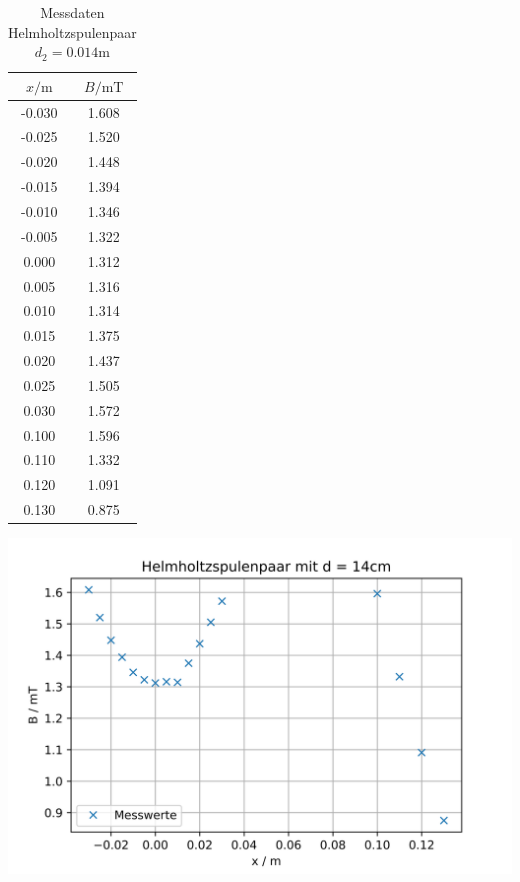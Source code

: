 \begin{table}
\centering
\caption{Messdaten Helmholtzspulenpaar $d_{2} = 0.014\unit\m$}
\begin{tabular}{c c}
  \toprule
  $x / \unit\m$ &  $B / \unit{\milli\tesla}$ \\
  \midrule
  -0.030 &        1.608 \\
  -0.025 &        1.520 \\
  -0.020 &        1.448 \\
  -0.015 &        1.394 \\
  -0.010 &        1.346 \\
  -0.005 &        1.322 \\
   0.000 &        1.312 \\
   0.005 &        1.316 \\
   0.010 &        1.314 \\
   0.015 &        1.375 \\
   0.020 &        1.437 \\
   0.025 &        1.505 \\
   0.030 &        1.572 \\
   0.100 &        1.596 \\
   0.110 &        1.332 \\
   0.120 &        1.091 \\
   0.130 &        0.875 \\
  \bottomrule
  \end{tabular}
\end{table}

\includegraphics[width=\textwidth]{pictures/Helmholtz2.png}    %


